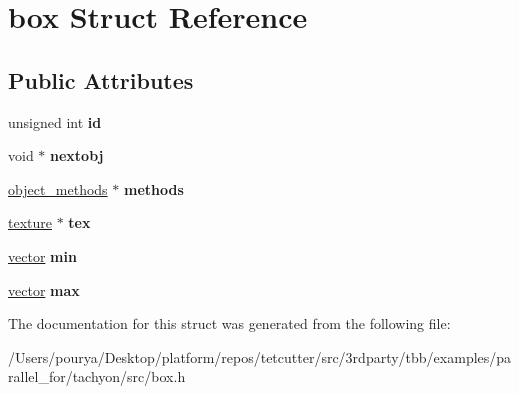 \hypertarget{structbox}{}\section{box Struct Reference}
\label{structbox}
\subsection*{Public Attributes}
\begin{DoxyCompactItemize}
\item 
\hypertarget{structbox_a4c988617838687089b6b006434719e8b}{}unsigned int {\bfseries id}\label{structbox_a4c988617838687089b6b006434719e8b}

\item 
\hypertarget{structbox_ac5ed69571d5944932c6a2ad0a85164cc}{}void $\ast$ {\bfseries nextobj}\label{structbox_ac5ed69571d5944932c6a2ad0a85164cc}

\item 
\hypertarget{structbox_aa31fbe3d173747e5f6a30d26205f4cd0}{}\hyperlink{structobject__methods}{object\+\_\+methods} $\ast$ {\bfseries methods}\label{structbox_aa31fbe3d173747e5f6a30d26205f4cd0}

\item 
\hypertarget{structbox_ae91ae94a740ab6ff1ad74d2b6c9639f2}{}\hyperlink{structtexture}{texture} $\ast$ {\bfseries tex}\label{structbox_ae91ae94a740ab6ff1ad74d2b6c9639f2}

\item 
\hypertarget{structbox_ac243fd4b059a194ee567658900d2a061}{}\hyperlink{structvector}{vector} {\bfseries min}\label{structbox_ac243fd4b059a194ee567658900d2a061}

\item 
\hypertarget{structbox_a1a27f39de37d687365ed5934af52b3d2}{}\hyperlink{structvector}{vector} {\bfseries max}\label{structbox_a1a27f39de37d687365ed5934af52b3d2}

\end{DoxyCompactItemize}


The documentation for this struct was generated from the following file\+:\begin{DoxyCompactItemize}
\item 
/\+Users/pourya/\+Desktop/platform/repos/tetcutter/src/3rdparty/tbb/examples/parallel\+\_\+for/tachyon/src/box.\+h\end{DoxyCompactItemize}
